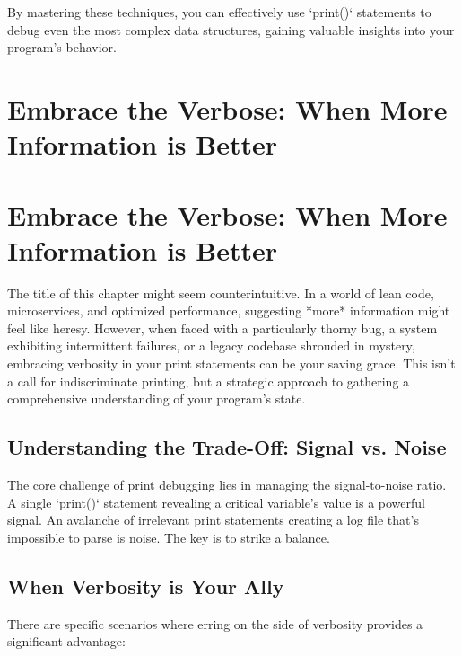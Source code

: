 \documentclass{article}
\begin{document}
By mastering these techniques, you can effectively use `print()` statements to debug even the most complex data structures, gaining valuable insights into your program's behavior.

\newpage

\section*{Embrace the Verbose: When More Information is Better} %
\label{chapter-2-9-Embrace_the_Verbose__When_More_Informati}

\section*{Embrace the Verbose: When More Information is Better}

The title of this chapter might seem counterintuitive. In a world of lean code, microservices, and optimized performance, suggesting *more* information might feel like heresy. However, when faced with a particularly thorny bug, a system exhibiting intermittent failures, or a legacy codebase shrouded in mystery, embracing verbosity in your print statements can be your saving grace.  This isn't a call for indiscriminate printing, but a strategic approach to gathering a comprehensive understanding of your program's state.

\subsection*{Understanding the Trade-Off: Signal vs. Noise}

The core challenge of print debugging lies in managing the signal-to-noise ratio.  A single `print()` statement revealing a critical variable's value is a powerful signal.  An avalanche of irrelevant print statements creating a log file that's impossible to parse is noise.  The key is to strike a balance.

\subsection*{When Verbosity is Your Ally}

There are specific scenarios where erring on the side of verbosity provides a significant advantage:
\end{document}
